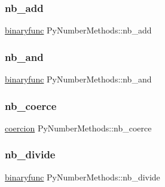 \mbox{\label{struct_py_number_methods_ada624d95704d8ec3491a6e6473b5c6af}} 
\subsubsection{\texorpdfstring{nb\_add}{nb\_add}}
{\footnotesize\ttfamily \mbox{\hyperlink{_python27_2object_8h_a1a50b2d154f36acb9d215f2cdc1561a8}{binaryfunc}} Py\+Number\+Methods\+::nb\+\_\+add}

\mbox{\label{struct_py_number_methods_a4b3d3a6ff70631b1c23aa98e636831e9}} 
\subsubsection{\texorpdfstring{nb\_and}{nb\_and}}
{\footnotesize\ttfamily \mbox{\hyperlink{_python27_2object_8h_a1a50b2d154f36acb9d215f2cdc1561a8}{binaryfunc}} Py\+Number\+Methods\+::nb\+\_\+and}

\mbox{\label{struct_py_number_methods_a8e8ef984e72bd3a195eb372261bf1a72}} 
\subsubsection{\texorpdfstring{nb\_coerce}{nb\_coerce}}
{\footnotesize\ttfamily \mbox{\hyperlink{_python27_2object_8h_a26d72dcf63c2f4b09906a55dec3bced4}{coercion}} Py\+Number\+Methods\+::nb\+\_\+coerce}

\mbox{\label{struct_py_number_methods_a6d710102166e75368fa05f4bc818f6a7}} 
\subsubsection{\texorpdfstring{nb\_divide}{nb\_divide}}
{\footnotesize\ttfamily \mbox{\hyperlink{_python27_2object_8h_a1a50b2d154f36acb9d215f2cdc1561a8}{binaryfunc}} Py\+Number\+Methods\+::nb\+\_\+divide}

